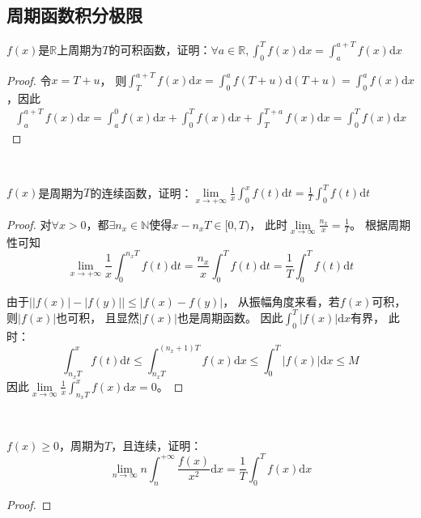\subsection{周期函数积分极限}

\begin{exercise}
  $f(x)$是$\mathbb{R}$上周期为$T$的可积函数，证明：$\forall a \in \mathbb{R}, \int_0^T f(x) \mathrm{d} x = \int_a^{a+T} f(x) \mathrm{d} x$
\end{exercise}

\begin{proof}
  令$x = T + u$，
  则$\int_T^{a+T}f(x)\mathrm{d} x = \int_0^a f(T + u)\mathrm{d} (T + u) = \int_0^a f(x)\mathrm{d} x$，因此
  \begin{align*}
    \int_a^{a+T}f(x)\mathrm{d} x = \int_a^0 f(x) \mathrm{d} x + \int_0^T f(x) \mathrm{d} x + \int_T^{T+a} f(x)\mathrm{d} x = \int_0^T f(x)\mathrm{d} x
  \end{align*}
\end{proof}

~

\begin{exercise}
  $f(x)$是周期为$T$的连续函数，证明：$\lim \limits _{x \rightarrow +\infty}\frac{1}{x}\int_0^x f(t)\mathrm{d}t = \frac{1}{T} \int_0^T f(t)\mathrm{d} t$
\end{exercise}

\begin{proof}
  对$\forall x > 0$，都$\exists n_x \in \mathbb{N}$使得$x - n_xT \in [0,T)$，
  此时$\lim \limits _{x \rightarrow \infty} \frac{n_x}{x} = \frac{1}{T}$。
  根据周期性可知
  \begin{equation*}
    \lim \limits _{x \rightarrow +\infty} \frac{1}{x} \int_0^{n_xT} f(t)\mathrm{d} t = \frac{n_x}{x} \int_0^T f(t)\mathrm{d} t = \frac{1}{T} \int_0^T f(t)\mathrm{d} t
  \end{equation*}

  由于$\left| |f(x)| - |f(y)| \right| \leq |f(x) - f(y)|$，
  从振幅角度来看，若$f(x)$可积，则$|f(x)|$也可积，
  且显然$|f(x)|$也是周期函数。
  因此$\int_0^T |f(x)|\mathrm{d} x$有界，
  此时：
  \begin{equation*}
   \int_{n_x T}^x f(t)\mathrm{d} t \leq  \int_{n_x T}^{(n_x+1)T}f(x)\mathrm{d} x \leq \int_0^T |f(x)|\mathrm{d} x \leq M
  \end{equation*}
  因此$\lim \limits _{x \rightarrow \infty}\frac{1}{x} \int_{n_x T}^x f(x)\mathrm{d} x = 0$。
\end{proof}

~

\begin{exercise}[进阶难度]
  $f(x) \geq 0$，周期为$T$，且连续，证明：
  \begin{equation*}
    \lim \limits _{n \rightarrow \infty} n \int_n^{+\infty} \frac{f(x)}{x^2}\mathrm{d} x = \frac{1}{T} \int_0^T f(x)\mathrm{d} x
  \end{equation*}
\end{exercise}

\begin{proof}
  
\end{proof}

